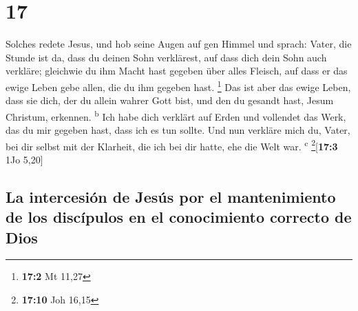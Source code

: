 \hypertarget{section-16}{%
\section{17}\label{section-16}}

 Solches redete Jesus, und hob seine Augen auf gen Himmel
und sprach: Vater, die Stunde ist da, dass du deinen Sohn verklärest,
auf dass dich dein Sohn auch verkläre;  gleichwie du ihm
Macht hast gegeben über alles Fleisch, auf dass er das ewige Leben gebe
allen, die du ihm gegeben hast. \footnote{\textbf{17:2} Mt 11,27}
 Das ist aber das ewige Leben, dass sie dich, der du
allein wahrer Gott bist, und den du gesandt hast, Jesum Christum,
erkennen. \textsuperscript{b}  Ich habe dich verklärt auf
Erden und vollendet das Werk, das du mir gegeben hast, dass ich es tun
sollte.  Und nun verkläre mich du, Vater, bei dir selbst
mit der Klarheit, die ich bei dir hatte, ehe die Welt war.
\textsuperscript{c} \footnote{\textbf{17:10} Joh 16,15}{[}\textbf{17:3}
1Jo 5,20{]}

\hypertarget{la-intercesiuxf3n-de-jesuxfas-por-el-mantenimiento-de-los-discuxedpulos-en-el-conocimiento-correcto-de-dios}{%
\subsection{La intercesión de Jesús por el mantenimiento de los
discípulos en el conocimiento correcto de
Dios}\label{la-intercesiuxf3n-de-jesuxfas-por-el-mantenimiento-de-los-discuxedpulos-en-el-conocimiento-correcto-de-dios}}

